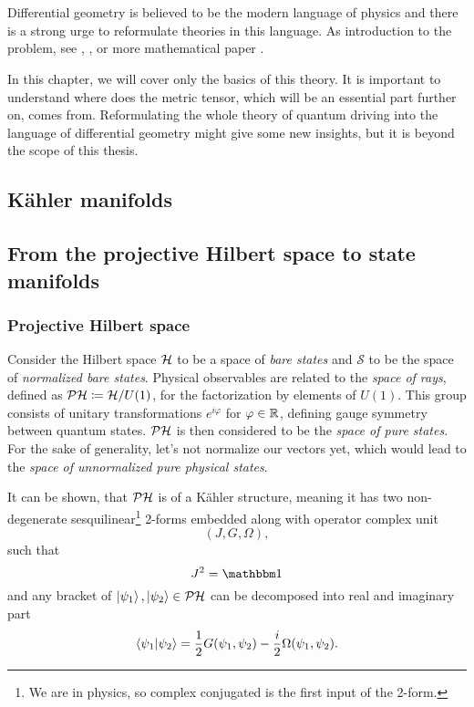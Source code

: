 \chapter{}
Differential geometry is believed to be the modern language of physics and there is a strong urge to reformulate theories in this language. As introduction to the problem, see \cite{ashtekar_geometrical_1997}, \cite{ashtekar_geometry_1995}, or more mathematical paper \cite{molitor_exponential_2013}.

In this chapter, we will cover only the basics of this theory. It is important to understand where does the metric tensor, which will be an essential part further on, comes from. Reformulating the whole theory of quantum driving into the language of differential geometry might give some new insights, but it is beyond the scope of this thesis.

\section{K\"ahler manifolds}



\section{From the projective Hilbert space to state manifolds}

\subsection{Projective Hilbert space}
Consider the Hilbert space $\mathcal{H}$ to be a space of \emph{bare states} and $\mathcal{S}$ to be the space of \emph{normalized bare states}. Physical observables are related to the \emph{space of rays}, defined as $\mathcal{PH}\coloneqq \mathcal{H}/U(1)$, for the factorization by elements of $U(1)$. This group consists of unitary transformations $e^{i\varphi}$ for $\varphi\in\mathbb{R}$, defining gauge symmetry between quantum states. $\mathcal{PH}$ is then considered to be the \emph{space of pure states}. For the sake of generality, let's not normalize our vectors yet, which would lead to the \emph{space of unnormalized pure physical states}. 

It can be shown, that $\mathcal{PH}$ is of a K\"ahler structure, meaning it has two non-degenerate sesquilinear\footnote{We are in physics, so complex conjugated is the first input of the 2-form.} 2-forms embedded along with operator complex unit
$$(J, G, \Omega),$$
such that
\begin{equation}
    J^2=\Id
\end{equation}
and any bracket of $\ket{\psi_1},\ket{\psi_2}\in \mathcal{PH}$ can be decomposed into real and imaginary part\citep{ashtekar_geometrical_1997}
\begin{equation}
    \braket{\psi_1|\psi_2}=\frac{1}{2}G(\psi_1,\psi_2)-\frac{i}{2}\Omega(\psi_1,\psi_2).
    \label{eq:quantumProd}
\end{equation}

